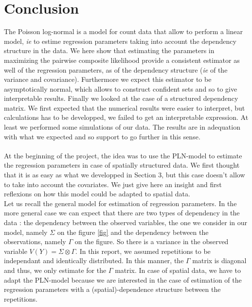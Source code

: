 \documentclass[11pt, a4paper]{article}
\begin{document}
\section{Conclusion}
The Poisson log-normal is a model for count data that allow to perform a linear model, \textit{ie} to estime regression parameters taking into account the dependency structure in the data. We here show that estimating the parameters in maximizing the pairwise composite likelihood provide a consistent estimator as well of the regression parameters, as of the dependency structure (\textit{ie} of the variance and covariance). Furthermore we expect this estimator to be asymptotically normal, which allows to construct confident sets and so to give interpretable results. Finally we looked at the case of a structured dependency matrix. We first expected that the numerical results were easier to interpret, but calculations has to be developped, we failed to get an interpretable expression. At least we performed some simulations of our data. The results are in adequation with what we expected and so support to go further in this sense.\\
\\
At the beginning of the project, the idea was to use the PLN-model to estimate the regression parameters in case of spatially structured data. We first thought that it is as easy as what we developped in Section 3, but this case doesn't allow to take into account the covariates. We just give here an insight and first reflexions on how this model could be adapted to spatial data. \\
Let us recall the general model for estimation of regression parameters. In the more general case we can expect that there are two types of dependency in the data : the dependency between the observed variables, the one we consider in our model, namely $\Sigma$ on the figure \ref{fig} and the dependency between the observations, namely $\Gamma$ on the figure. So there is a variance in the observed variable $V(Y) = \Sigma \otimes \Gamma$. In this report, we assumed repetitions to be independant and identically distributed. In this manner, the $\Gamma$ matrix is diagonal and thus, we only estimate for the $\Gamma$ matrix. In case of spatial data, we have to adapt the PLN-model because we are interested in the case of estimation of the regression parameters with a (spatial)-dependence structure between the repetitions.
\end{document}
